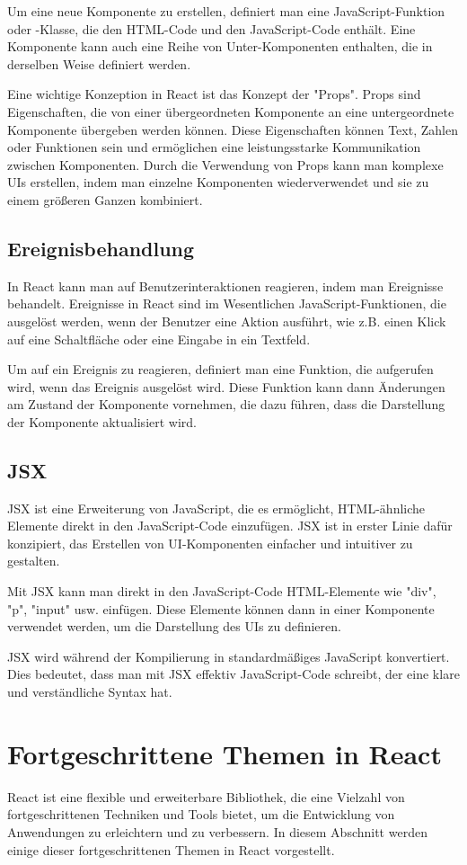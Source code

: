 Um eine neue Komponente zu erstellen, definiert man eine JavaScript-Funktion oder -Klasse, die den HTML-Code und den JavaScript-Code enthält. Eine Komponente kann auch eine Reihe von Unter-Komponenten enthalten, die in derselben Weise definiert werden.

Eine wichtige Konzeption in React ist das Konzept der "Props". Props sind Eigenschaften, die von einer übergeordneten Komponente an eine untergeordnete Komponente übergeben werden können. Diese Eigenschaften können Text, Zahlen oder Funktionen sein und ermöglichen eine leistungsstarke Kommunikation zwischen Komponenten. Durch die Verwendung von Props kann man komplexe UIs erstellen, indem man einzelne Komponenten wiederverwendet und sie zu einem größeren Ganzen kombiniert.


\subsection{Ereignisbehandlung}
In React kann man auf Benutzerinteraktionen reagieren, indem man Ereignisse behandelt. Ereignisse in React sind im Wesentlichen JavaScript-Funktionen, die ausgelöst werden, wenn der Benutzer eine Aktion ausführt, wie z.B. einen Klick auf eine Schaltfläche oder eine Eingabe in ein Textfeld.

Um auf ein Ereignis zu reagieren, definiert man eine Funktion, die aufgerufen wird, wenn das Ereignis ausgelöst wird. Diese Funktion kann dann Änderungen am Zustand der Komponente vornehmen, die dazu führen, dass die Darstellung der Komponente aktualisiert wird.


\subsection{JSX}
JSX ist eine Erweiterung von JavaScript, die es ermöglicht, HTML-ähnliche Elemente direkt in den JavaScript-Code einzufügen. JSX ist in erster Linie dafür konzipiert, das Erstellen von UI-Komponenten einfacher und intuitiver zu gestalten.

Mit JSX kann man direkt in den JavaScript-Code HTML-Elemente wie "div", "p", "input" usw. einfügen. Diese Elemente können dann in einer Komponente verwendet werden, um die Darstellung des UIs zu definieren.

JSX wird während der Kompilierung in standardmäßiges JavaScript konvertiert. Dies bedeutet, dass man mit JSX effektiv JavaScript-Code schreibt, der eine klare und verständliche Syntax hat.

\section{Fortgeschrittene Themen in React}
React ist eine flexible und erweiterbare Bibliothek, die eine Vielzahl von fortgeschrittenen Techniken und Tools bietet, um die Entwicklung von Anwendungen zu erleichtern und zu verbessern. In diesem Abschnitt werden einige dieser fortgeschrittenen Themen in React vorgestellt.

